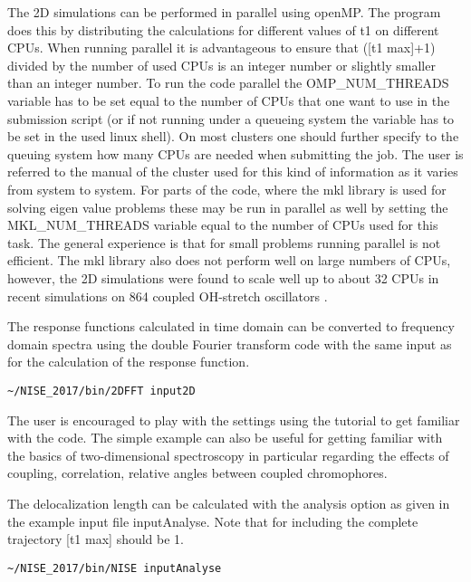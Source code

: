 The 2D simulations can be performed in parallel using openMP. The program does this by distributing the calculations for different values of t1 on different CPUs. When running parallel it is advantageous to ensure that ([t1 max]+1) divided by the number of used CPUs is an integer number or slightly smaller than an integer number. To run the code parallel the OMP\_NUM\_THREADS variable has to be set equal to the number of CPUs that one want to use in the submission script (or if not running under a queueing system the variable has to be set in the used linux shell). On most clusters one should further specify to the queuing system how many CPUs are needed when submitting the job. The user is referred to the manual of the cluster used for this kind of information as it varies from system to system. For parts of the code, where the mkl library is used for solving eigen value problems these may be run in parallel as well by setting the MKL\_NUM\_THREADS variable equal to the number of CPUs used for this task. The general experience is that for small problems running parallel is not efficient. The mkl library also does not perform well on large numbers of CPUs, however, the 2D simulations were found to scale well up to about 32 CPUs in recent simulations on 864 coupled OH-stretch oscillators \cite{Shi.2016.PCCP}.

The response functions calculated in time domain can be converted to frequency domain spectra using the double Fourier transform code with the same input as for the calculation of the response function.
\begin{verbatim}
~/NISE_2017/bin/2DFFT input2D
\end{verbatim}

The user is encouraged to play with the settings using the tutorial to get familiar with the code.
The simple example can also be useful for getting familiar with the basics of two-dimensional spectroscopy in particular regarding the effects of coupling, correlation, relative angles between
coupled chromophores.

The delocalization length \cite{Thouless.1974.PR.13.93} can be calculated with the analysis option as given in 
the example input file inputAnalyse. Note that for including the complete trajectory [t1 
max] should be 1. 
\begin{verbatim}
~/NISE_2017/bin/NISE inputAnalyse 
\end{verbatim}

